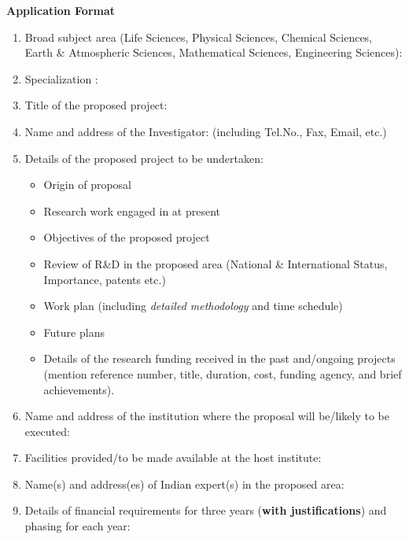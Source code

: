 \documentclass[11pt]{article}
\begin{document}
\baselineskip 16pt
\thispagestyle{empty}

\begin{center}
  {\bf Application Format}
\end{center}

\begin{enumerate}
  \item Broad subject area (Life Sciences, Physical Sciences, Chemical Sciences, Earth \& Atmospheric Sciences, Mathematical Sciences, Engineering Sciences):
  \item Specialization :
  \item Title of the proposed project:
  \item Name and address of the Investigator: (including Tel.No., Fax, Email, etc.)
  \item Details of the proposed project to be undertaken:
    \begin{itemize}
      \item Origin of proposal
      \item Research work engaged in at present
      \item Objectives of the proposed project
      \item Review of R\&D in the proposed area (National \& International Status, Importance, patents etc.)
      \item Work plan (including \textit{detailed methodology} and time schedule)
      \item Future plans
      \item Details of the research funding received in the past and/ongoing projects (mention reference number, title, duration, cost, funding agency, and brief achievements).
    \end{itemize}
  \item Name and address of the institution where the proposal will be/likely to be executed:
  \item Facilities provided/to be made available at the host institute:
  \item Name(s) and address(es) of Indian expert(s) in the proposed area:
  \item Details of financial requirements for three years (\textbf{with justifications}) and phasing for each year:


\end{enumerate}
\end{document}
